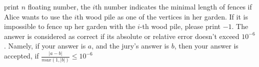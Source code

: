 print $n$ floating number, the $i$th number indicates the minimal length of fences if Alice wants to use the $i$th  wood pile as one of the vertices in her garden.
If it is impossible to fence up her garden with the $i$-th  wood pile, please print $-1$.
The answer is considered as correct if its absolute or relative error doesn't exceed $10^{−6}$.
Namely, if your answer is $a$, and the jury's answer is $b$, then your answer is accepted, if $\frac{|a-b|}{max(1,|b|)}\leq 10^{-6}$

